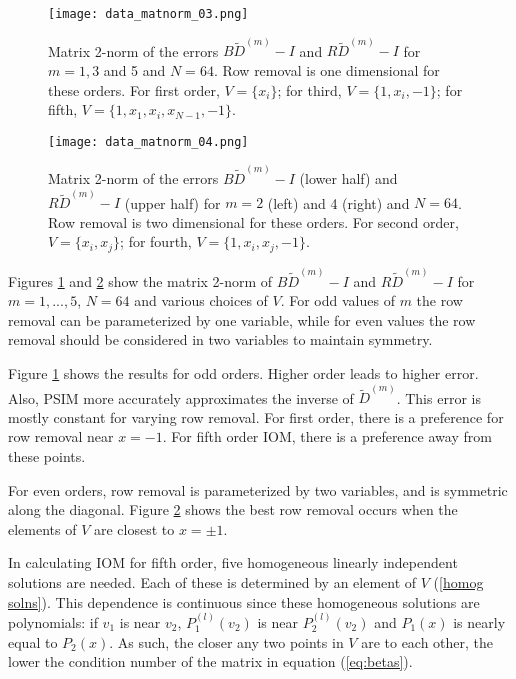 \documentclass{sfuthesis}
\begin{document}
\begin{figure}
\texttt{[image: data\_matnorm\_03.png]}
\caption{Matrix 2-norm of the errors $B \tilde{D}^{(m)} - I$ and $R \tilde{D}^{(m)} - I$ for $m = 1, 3$ and 5 and $N=64$.
Row removal is one dimensional for these orders.
For first order, $V = \{ x_i \}$;
for third, $V = \{1, x_i, -1\}$;
for fifth, $V = \{1, x_1, x_i, x_{N-1}, -1 \}$.}
\label{fig:MatNormV1}
\end{figure}

\begin{figure}
\texttt{[image: data\_matnorm\_04.png]}
\caption{Matrix 2-norm of the errors $B \tilde{D}^{(m)} - I$ (lower half) and $R \tilde{D}^{(m)} - I$ (upper half) for $m = 2$ (left) and 4 (right) and $N=64$.
Row removal is two dimensional for these orders.
For second order, $V = \{x_i, x_j \}$;
for fourth, $V = \{1, x_i, x_j, -1\}$.}
\label{fig:MatNormV2}
\end{figure}

Figures \ref{fig:MatNormV1} and \ref{fig:MatNormV2} show the matrix 2-norm of $B \tilde{D}^{(m)} - I$ and $R \tilde{D}^{(m)} - I$
for $m = 1,...,5$, $N = 64$ and various choices of $V$.
For odd values of $m$ the row removal can be parameterized by one variable,
while for even values the row removal should be considered in two variables to maintain symmetry.

Figure \ref{fig:MatNormV1} shows the results for odd orders.
Higher order leads to higher error.
Also, PSIM more accurately approximates the inverse of $\tilde{D}^{(m)}$.
This error is mostly constant for varying row removal.
For first order, there is a preference for row removal near $x = -1$.
For fifth order IOM, there is a preference away from these points.

For even orders, row removal is parameterized by two variables, and is symmetric along the diagonal.
Figure \ref{fig:MatNormV2} shows the best row removal occurs when the elements of $V$ are closest to $x = \pm 1$.

In calculating IOM for fifth order, five homogeneous linearly independent solutions are needed.
Each of these is determined by an element of $V$ (\ref{homog solns}).
This dependence is continuous since these homogeneous solutions are polynomials:
if $v_1$ is near $v_2$, $P^{(l)}_1(v_2)$ is near $P^{(l)}_2(v_2)$ and $P_1(x)$ is nearly equal to $P_2(x)$.
As such, the closer any two points in $V$ are to each other, the lower the condition number of the matrix in equation (\ref{eq:betas}).
\end{document}
